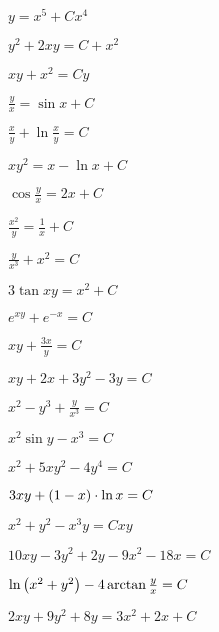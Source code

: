 	\label{sol:firstorder:homogeneous}
	\begin{enumsols}

		\item \( y = x^5 + Cx^4 \) %
		\item \( y^2 + 2xy = C + x^2 \) %
		\item \( xy + x^2 = Cy \) %
		\item \( \frac{y}{x} = \sin{x} + C \) %
		\item \( \frac{x}{y} + \ln{\frac{x}{y}} = C \) %
		\item \( xy^2 = x - \ln{x} + C \) %
		\item \( \cos{\frac{y}{x}} = 2x + C \) %
		\item \( \frac{x^2}{y} = \frac{1}{x} + C \) %
		\item \( \frac{y}{x^3} + x^2 = C \) %
		\item \( 3 \tan{xy} = x^2 + C \) %
		\item \( e^{xy} + e^{-x} = C \) %
		\item \( xy + \frac{3x}{y} = C \) %
		\item \( xy + 2x + 3y^2 - 3y = C \) %
		\item \( x^2 - y^3 + \frac{y}{x^3} = C \) %
		\item \( x^2 \sin{y} - x^3 = C \) %
		\label{sol:firstorder:homogeneous2}
		\item \( x^2 + 5xy^2 - 4y^4 = C \) %
		\item \( 3xy + \left( 1 - x \right) \cdot \ln{x} = C \) %
		\item \( x^2 + y^2 - x^3 y = Cxy \) %
		\item \( 10xy - 3y^2 + 2y - 9x^2 - 18x = C \) %
		\item \( \ln\left( x^2 + y^2 \right) - 4 \arctan{\frac{y}{x}} = C \) %
		\item \( 2xy + 9y^2 + 8y = 3x^2 + 2x + C \) %

\end{enumsols}
